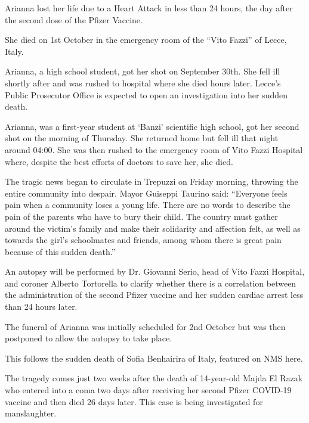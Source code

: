 Arianna lost her life due to a Heart Attack in less than 24 hours, the day after
the second dose of the Pfizer Vaccine.

She died on 1st October in the emergency room of the “Vito Fazzi” of Lecce,
Italy.

Arianna, a high school student, got her shot on September 30th. She fell ill
shortly after and was rushed to hospital where she died hours later. Lecce’s
Public Prosecutor Office is expected to open an investigation into her sudden
death.

Arianna, was a first-year student at ‘Banzi’ scientific high school, got her
second shot on the morning of Thursday. She returned home but fell ill that
night around 04:00. She was then rushed to the emergency room of Vito Fazzi
Hospital where, despite the best efforts of doctors to save her, she died.

The tragic news began to circulate in Trepuzzi on Friday morning, throwing the
entire community into despair. Mayor Guiseppi Taurino said: “Everyone feels pain
when a community loses a young life. There are no words to describe the pain of
the parents who have to bury their child. The country must gather around the
victim’s family and make their solidarity and affection felt, as well as towards
the girl’s schoolmates and friends, among whom there is great pain because of
this sudden death.”

An autopsy will be performed by Dr. Giovanni Serio, head of Vito Fazzi Hospital,
and coroner Alberto Tortorella to clarify whether there is a correlation between
the administration of the second Pfizer vaccine and her sudden cardiac arrest
less than 24 hours later.

The funeral of Arianna was initially scheduled for 2nd October but was then
postponed to allow the autopsy to take place.

This follows the sudden death of Sofia Benhairira of Italy, featured on NMS
here.

The tragedy comes just two weeks after the death of 14-year-old Majda El Razak
who entered into a coma two days after receiving her second Pfizer COVID-19
vaccine and then died 26 days later. This case is being investigated for
manslaughter.

